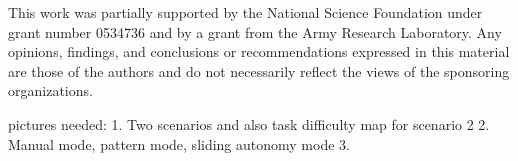\documentclass[journal]{IEEEtran}
\begin{document}
This work was partially supported by 
the National Science Foundation 
under grant number 
0534736 
and by a grant from
the Army Research Laboratory.
Any opinions, findings, and conclusions or recommendations expressed in this material are those of the authors and do not necessarily reflect the views of the sponsoring organizations.






pictures needed:
1. Two scenarios and also task difficulty map for scenario 2
2. Manual mode, pattern mode, sliding autonomy mode
3. 



\end{document}
